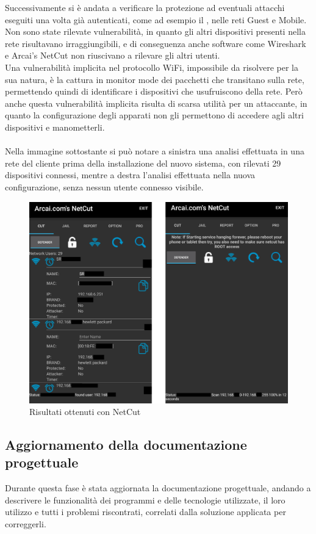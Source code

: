\documentclass[Realizzazione.tex]{subfiles}
\begin{document}
Successivamente si è andata a verificare la protezione ad eventuali attacchi eseguiti una volta già autenticati, come ad esempio il , nelle reti Guest e Mobile. \\
Non sono state rilevate vulnerabilità, in quanto gli altri dispositivi presenti nella rete risultavano irraggiungibili, e di conseguenza anche software come Wireshark e Arcai's NetCut non riuscivano a rilevare gli altri utenti. \\
Una vulnerabilità implicita nel protocollo WiFi, impossibile da risolvere per la sua natura, è la cattura in monitor mode dei pacchetti che transitano sulla rete, permettendo quindi di identificare i dispositivi che usufruiscono della rete. Però anche questa vulnerabilità implicita risulta di scarsa utilità per un attaccante, in quanto la configurazione degli apparati non gli permettono di accedere agli altri dispositivi e manometterli. \\\\
Nella immagine sottostante si può notare a sinistra una analisi effettuata in una rete del cliente prima della installazione del nuovo sistema, con rilevati 29 dispositivi connessi, mentre a destra l'analisi effettuata nella nuova configurazione, senza nessun utente connesso visibile.
\begin{figure}[H]
	\centering
	\includegraphics[width=0.95\linewidth]{"images/netcut"}
	\caption{Risultati ottenuti con NetCut}
	\label{fig:Risultati ottenuti con NetCut}
\end{figure}


\subsection{Aggiornamento della documentazione progettuale}
Durante questa fase è stata aggiornata la documentazione progettuale, andando a descrivere le funzionalità dei programmi e delle tecnologie utilizzate, il loro utilizzo e tutti i problemi riscontrati, correlati dalla soluzione applicata per correggerli.
	
\end{document}
